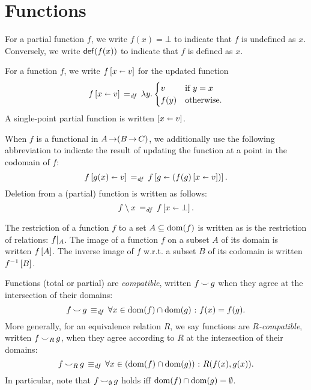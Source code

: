 \documentclass[11pt]{report}
\begin{document}

\section{Functions} %
\label{sec:functions}

For a partial function $f$, we write $f(x) = \bot$ to indicate that $f$ is undefined as $x$. Conversely, we write $\mathsf{def}(f(x))$ to indicate that $f$ is defined as $x$. 

For a function $f$, we write $f \left[ x \shortleftarrow v \right]$ for the updated function \begin{equation}
	\label{eq:funup}
	f \left[ x \shortleftarrow v \right] \operatorname{\;=_{\mathit{df}}\;} \lambda y . \begin{cases}
		v & \text{if $y = x$} \\
		f(y) & \text{otherwise.} 
	\end{cases}
\end{equation} A single-point partial function is written $ \left[ x \shortleftarrow v \right]$. 

When $f$ is a functional in $A \operatorname{\rightarrow} (B \operatorname{\rightarrow} C)$, we additionally use the following abbreviation to indicate the result of updating the function at a point in the codomain of $f$: \begin{equation}
	\label{eq:recup}
	f \left[ g(x) \shortleftarrow v \right] \operatorname{\;=_{\mathit{df}}\;} f \left[ g \shortleftarrow \left(f(g) \left[ x \shortleftarrow v \right]\right) \right].
\end{equation}
Deletion from a (partial) function is written as follows: \begin{equation}
	\label{eq:fundel}
	f \setminus x  \operatorname{\;=_{\mathit{df}}\;} f \left[ x \shortleftarrow \bot \right].
\end{equation} 

The restriction of a function $f$ to a set $A \subseteq \operatorname{\mathrm{dom}}(f)$ is written as is the restriction of relations: $f |_{A}$. The image of a function $f$ on a subset $A$ of its domain is written $f\left[A\right]$. The inverse image of $f$ w.r.t. a subset $B$ of its codomain is written $f^{-1}\left[B\right]$.

Functions (total or partial) are \emph{compatible}, written $f \operatorname{\smile} g$ when they agree at the intersection of their domains: \[ f \operatorname{\smile} g \operatorname{\;\equiv_{\mathit{df}}\;} \forall x \in \operatorname{\mathrm{dom}}(f) \cap \operatorname{\mathrm{dom}}(g) \operatorname{\,:\,} f(x) = f(g).\] More generally, for an equivalence relation $R$, we say functions are \emph{$R$-compatible}, written $f \operatorname{\smile}_R g$, when they agree according to $R$ at the intersection of their domains: \[ f \operatorname{\smile}_R g \operatorname{\;\equiv_{\mathit{df}}\;} \forall x \in \left(\operatorname{\mathrm{dom}}(f) \cap \operatorname{\mathrm{dom}}(g)\right) \operatorname{\,:\,} R(f(x),g(x)).\] In particular, note that $f \operatorname{\smile}_{\operatorname{\emptyset}} g$ holds iff $\operatorname{\mathrm{dom}}(f) \cap \operatorname{\mathrm{dom}}(g) = \operatorname{\emptyset}$. 
\end{document}
